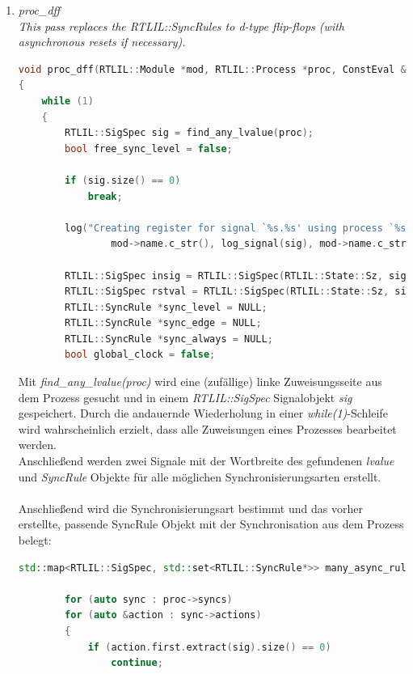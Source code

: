 \documentclass[11pt]{report}
\begin{document}
\begin{enumerate}
\item \textit{proc\_dff\\
This pass replaces the RTLIL::SyncRules to d-type flip-flops (with asynchronous resets if necessary).}
\begin{lstlisting}[language=C++]
void proc_dff(RTLIL::Module *mod, RTLIL::Process *proc, ConstEval &ce)
{
	while (1)
	{
		RTLIL::SigSpec sig = find_any_lvalue(proc);
		bool free_sync_level = false;

		if (sig.size() == 0)
			break;

		log("Creating register for signal `%s.%s' using process `%s.%s'.\n",
				mod->name.c_str(), log_signal(sig), mod->name.c_str(), proc->name.c_str());

		RTLIL::SigSpec insig = RTLIL::SigSpec(RTLIL::State::Sz, sig.size());
		RTLIL::SigSpec rstval = RTLIL::SigSpec(RTLIL::State::Sz, sig.size());
		RTLIL::SyncRule *sync_level = NULL;
		RTLIL::SyncRule *sync_edge = NULL;
		RTLIL::SyncRule *sync_always = NULL;
		bool global_clock = false;
\end{lstlisting}
Mit \textit{find\_any\_lvalue(proc)} wird eine (zufällige) linke Zuweisungsseite aus dem Prozess gesucht und in einem \textit{RTLIL::SigSpec} Signalobjekt \textit{sig} gespeichert. Durch die andauernde Wiederholung in einer \textit{while(1)}-Schleife wird wahrscheinlich erzielt, dass alle Zuweisungen eines Prozesses bearbeitet werden.\\
Anschließend werden zwei Signale mit der Wortbreite des gefundenen \textit{lvalue} und \textit{SyncRule} Objekte für alle möglichen Synchronisierungsarten erstellt.
\\
\\
Anschließend wird die Synchronisierungsart bestimmt und das vorher erstellte, passende SyncRule Objekt mit der Synchronisation aus dem Prozess belegt:
\begin{lstlisting}[language=C++]
std::map<RTLIL::SigSpec, std::set<RTLIL::SyncRule*>> many_async_rules;

		for (auto sync : proc->syncs)
		for (auto &action : sync->actions)
		{
			if (action.first.extract(sig).size() == 0)
				continue;


\end{lstlisting}
\end{enumerate}
\end{document}
